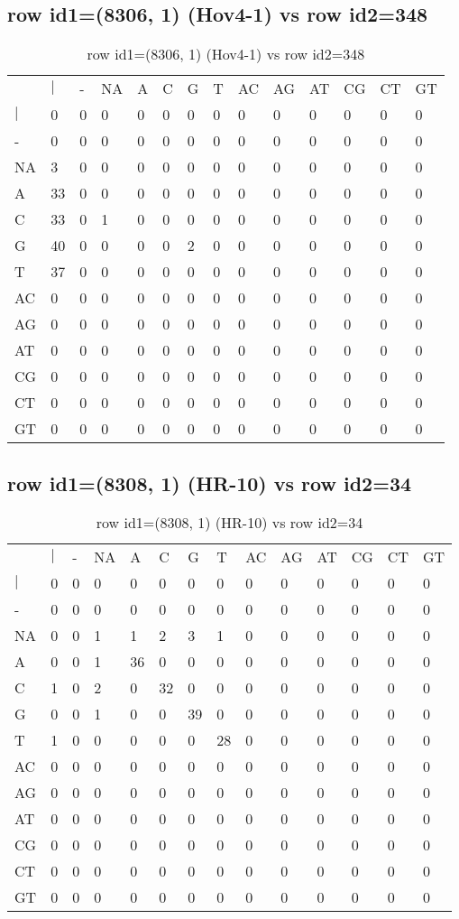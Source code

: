 \subsection{row id1=(8306, 1) (Hov4-1) vs row id2=348}
\begin{center}
\begin{longtable}{|l|l|l|l|l|l|l|l|l|l|l|l|l|l|}
\caption{row id1=(8306, 1) (Hov4-1) vs row id2=348} \label{table_dm484}\\
\hline
\\
\hline
&$|$&-&NA&A&C&G&T&AC&AG&AT&CG&CT&GT\\
$|$&0&0&0&0&0&0&0&0&0&0&0&0&0\\
-&0&0&0&0&0&0&0&0&0&0&0&0&0\\
NA&3&0&0&0&0&0&0&0&0&0&0&0&0\\
A&33&0&0&0&0&0&0&0&0&0&0&0&0\\
C&33&0&1&0&0&0&0&0&0&0&0&0&0\\
G&40&0&0&0&0&2&0&0&0&0&0&0&0\\
T&37&0&0&0&0&0&0&0&0&0&0&0&0\\
AC&0&0&0&0&0&0&0&0&0&0&0&0&0\\
AG&0&0&0&0&0&0&0&0&0&0&0&0&0\\
AT&0&0&0&0&0&0&0&0&0&0&0&0&0\\
CG&0&0&0&0&0&0&0&0&0&0&0&0&0\\
CT&0&0&0&0&0&0&0&0&0&0&0&0&0\\
GT&0&0&0&0&0&0&0&0&0&0&0&0&0\\
\hline
\end{longtable}
\end{center}

\subsection{row id1=(8308, 1) (HR-10) vs row id2=34}
\begin{center}
\begin{longtable}{|l|l|l|l|l|l|l|l|l|l|l|l|l|l|}
\caption{row id1=(8308, 1) (HR-10) vs row id2=34} \label{table_dm486}\\
\hline
\\
\hline
&$|$&-&NA&A&C&G&T&AC&AG&AT&CG&CT&GT\\
$|$&0&0&0&0&0&0&0&0&0&0&0&0&0\\
-&0&0&0&0&0&0&0&0&0&0&0&0&0\\
NA&0&0&1&1&2&3&1&0&0&0&0&0&0\\
A&0&0&1&36&0&0&0&0&0&0&0&0&0\\
C&1&0&2&0&32&0&0&0&0&0&0&0&0\\
G&0&0&1&0&0&39&0&0&0&0&0&0&0\\
T&1&0&0&0&0&0&28&0&0&0&0&0&0\\
AC&0&0&0&0&0&0&0&0&0&0&0&0&0\\
AG&0&0&0&0&0&0&0&0&0&0&0&0&0\\
AT&0&0&0&0&0&0&0&0&0&0&0&0&0\\
CG&0&0&0&0&0&0&0&0&0&0&0&0&0\\
CT&0&0&0&0&0&0&0&0&0&0&0&0&0\\
GT&0&0&0&0&0&0&0&0&0&0&0&0&0\\
\hline
\end{longtable}
\end{center}

